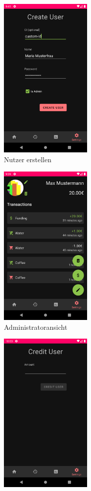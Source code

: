 \documentclass[a4paper, 11pt]{article}
\begin{document}
\begin{figure}[]
	\begin{subfigure}{.5\textwidth}
		\centering
		\includegraphics[height=8cm,keepaspectratio]{./images/screenshots/create-user.png}
		\caption{Nutzer erstellen}
		\label{fig:app:architecture:functionality:admin:create}
	\end{subfigure}
	\begin{subfigure}{.5\textwidth}
		\centering
		\includegraphics[height=8cm,keepaspectratio]{./images/screenshots/user-admin-view.png}
		\caption{Administratoransicht}
		\label{fig:app:architecture:functionality:admin:user}
	\end{subfigure}
	\begin{subfigure}{.5\textwidth}
		\centering
		\includegraphics[height=8cm,keepaspectratio]{./images/screenshots/crediting.png}

\end{subfigure}
\end{figure}
\end{document}
